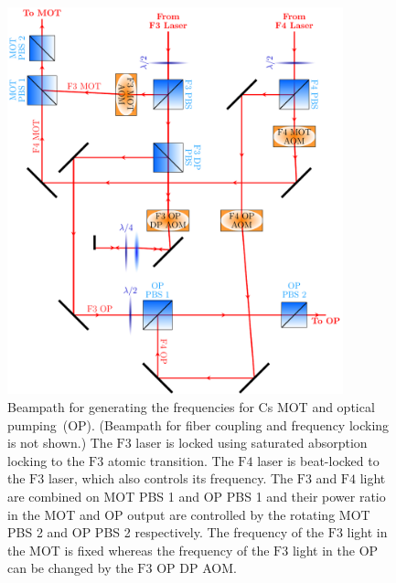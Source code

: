 \begin{figure}
  \centering
  \includegraphics[width=0.866\textwidth]{figures/loading_cs_res_beampath.pdf}
  \caption[Beampath for Cs $\mathrm{D2}$ light.]{
    Beampath for generating the frequencies for Cs MOT and optical pumping~(OP).
    (Beampath for fiber coupling and frequency locking is not shown.)
    The $\mathrm{F3}$ laser is locked using saturated absorption locking
    to the $\mathrm{F3}$ atomic transition.
    The $\mathrm{F4}$ laser is beat-locked to the $\mathrm{F3}$ laser,
    which also controls its frequency.
    The $\mathrm{F3}$ and $\mathrm{F4}$ light are combined on MOT PBS 1 and OP PBS 1
    and their power ratio in the MOT and OP output are controlled by the
    rotating MOT PBS 2 and OP PBS 2 respectively.
    The frequency of the $\mathrm{F3}$ light in the MOT is fixed whereas
    the frequency of the $\mathrm{F3}$ light in the OP
    can be changed by the $\mathrm{F3}$ OP DP AOM.
    \label{fig:loading:free-space:cs-res-beampath}}
\end{figure}

